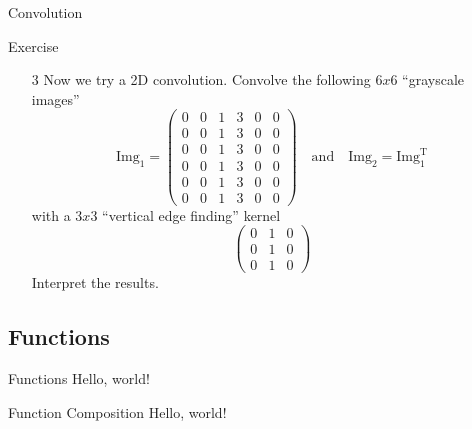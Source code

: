   \begin{frame}{Convolution}
    \begin{exampleblock}{Exercise}
      \begin{enumerate}
        \item[3] Now we try a 2D convolution.
          Convolve the following $6x6$ \enquote{grayscale images}
          \begin{equation*}
            \mathrm{Img}_1 = \begin{pmatrix}
              0 & 0 & 1 & 3 & 0 & 0 \\
              0 & 0 & 1 & 3 & 0 & 0 \\
              0 & 0 & 1 & 3 & 0 & 0 \\
              0 & 0 & 1 & 3 & 0 & 0 \\
              0 & 0 & 1 & 3 & 0 & 0 \\
              0 & 0 & 1 & 3 & 0 & 0
            \end{pmatrix}
            \quad\mathrm{and}\quad
            \mathrm{Img}_2 = \mathrm{Img}_1^\mathrm{T}
          \end{equation*}
          with a $3x3$ \enquote{vertical edge finding} kernel
          \begin{equation*}
            \begin{pmatrix}
              0 & 1 & 0 \\
              0 & 1 & 0 \\
              0 & 1 & 0
            \end{pmatrix}
          \end{equation*}
        Interpret the results.
      \end{enumerate}
    \end{exampleblock}
  \end{frame}

\subsection{Functions}

  \begin{frame}{Functions}
    Hello, world!
  \end{frame}

  \begin{frame}{Function Composition}
    Hello, world!
  \end{frame}


